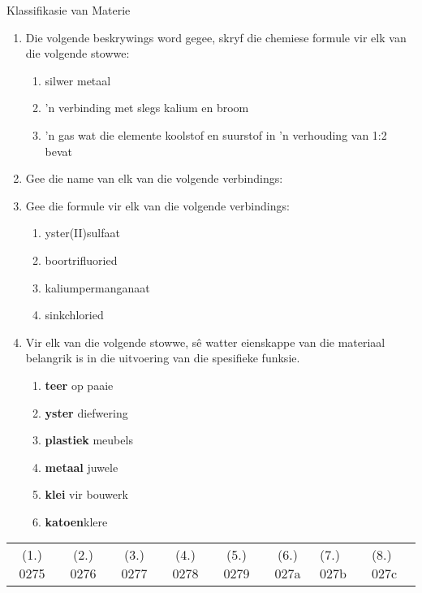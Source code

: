 \begin{eocexercises}{Klassifikasie van Materie}
{\begin{enumerate}[noitemsep, label=\textbf{\arabic*}. ]
\begin{enumerate}[noitemsep, label=\textbf{\alph*}. ]
\end{enumerate}
\item Die volgende beskrywings word gegee, skryf die chemiese formule vir elk van die volgende stowwe:
\begin{enumerate}[noitemsep, label=\textbf{\alph*}. ] 
\item silwer metaal
\item 'n verbinding met slegs kalium en broom
\item 'n gas wat die elemente koolstof en suurstof in 'n verhouding van 1:2 bevat
\end{enumerate}
\item Gee die name van elk van die volgende verbindings:
\begin{enumerate}[noitemsep, label=\textbf{\alph*}. ] 
\item $\text{NaBr}$
\item ${\text{Ba}(\text{NO}}}_{2})_2$
\item ${\text{SO}}_{2}$ 
\item $\text{H}_{2}\text{SO}_{4}$
\end{enumerate}
\item Gee die formule vir elk van die volgende verbindings:
\begin{enumerate}[noitemsep, label=\textbf{\alph*}.]
\item yster(II)sulfaat
\item boortrifluoried
\item kaliumpermanganaat
\item sinkchloried
\end{enumerate}

\item Vir elk van die volgende stowwe, sê watter eienskappe van die materiaal belangrik is in die uitvoering van die spesifieke funksie.
\begin{enumerate}[noitemsep, label=\textbf{\alph*}. ] 
\item \textbf{teer} op paaie
\item \textbf{yster} diefwering
\item \textbf{plastiek} meubels
\item \textbf{metaal} juwele
\item \textbf{klei} vir bouwerk
\item \textbf{katoen}klere
\end{enumerate}
\end{enumerate}

\practiceinfo
\begin{tabular}[h]{cccccc}
 (1.) 0275  &  (2.) 0276  &  (3.) 0277  &  (4.) 0278  &  (5.) 0279  &  (6.) 027a  &  (7.) 027b  &  (8.) 027c  & 
\end{tabular}
}
\end{eocexercises}
